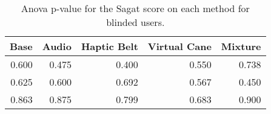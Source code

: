 
\begin{table}[!htb]
\centering
\caption{Anova p-value for the Sagat score on each method for blinded users.}
\label{tab:anova_sagat}
\begin{tabular}{rrrrr}
\toprule
 Base &  Audio &  Haptic Belt &  Virtual Cane &  Mixture \\
\midrule
0.600 &  0.475 &        0.400 &         0.550 &    0.738 \\
0.625 &  0.600 &        0.692 &         0.567 &    0.450 \\
0.863 &  0.875 &        0.799 &         0.683 &    0.900 \\
\bottomrule
\end{tabular}
\end{table}

